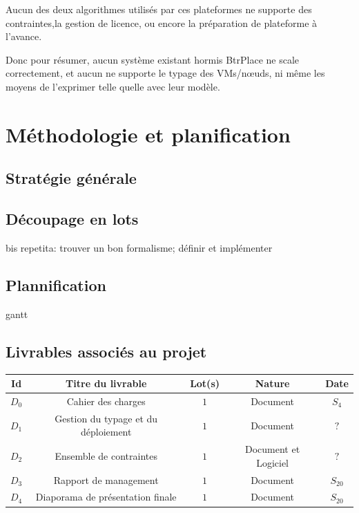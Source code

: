 \documentclass[a4paper]{article}
\begin{document}
Aucun des deux algorithmes utilisés par ces plateformes
ne supporte des contraintes,la gestion de licence, ou encore la
préparation de plateforme à l'avance.

 Donc pour résumer, aucun système existant hormis BtrPlace ne scale
correctement, et aucun ne supporte le typage des VMs/nœuds, ni même
les moyens de l'exprimer telle quelle avec leur modèle.

\section{Méthodologie et planification}
\subsection{Stratégie générale}
\subsection{Découpage en lots}
bis repetita: trouver un bon formalisme; définir et implémenter
\subsection{Plannification}
gantt
\subsection{Livrables associés au projet}
\begin{center}
\begin{tabular}{c|c|c|c|c}
	Id & Titre du livrable & Lot(s) & Nature & Date \\
	\hline
	\hline
	$D_0$ & Cahier des charges & $1$ & Document & $S_4$ \\
	\hline
	$D_1$ & Gestion du typage et du déploiement & $1$ & Document & $?$ \\
	\hline
	$D_2$ & Ensemble de contraintes & $1$ & Document et Logiciel & $?$ \\
	\hline
	$D_3$ & Rapport de management & $1$ & Document & $S_{20}$ \\
	\hline
	$D_4$ & Diaporama de présentation finale & $1$ & Document & $S_{20}$ \\
\end{tabular}
\end{center}
\end{document}
